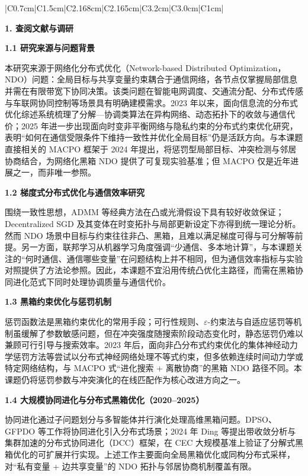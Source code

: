 \begin{center}
\begin{tabular}{|C{0.7cm}|C{1.5cm}|C{2.168cm}|C{2.165cm}|C{3.2cm}|C{3.0cm}|C{1cm}|}
{{    \noindent\textbf{1. 查阅文献与调研}
    
    \indent\textbf{1.1 研究来源与问题背景}
    
    本研究来源于网络化分布式优化（Network-based Distributed Optimization，NDO）问题：全局目标与共享变量约束耦合于通信网络，各节点仅掌握局部信息并需在有限带宽下协同决策\cite{chica2023}。该类问题在智能电网调度、交通流分配、分布式传感与车联网协同控制等场景具有明确建模需求。2023 年以来，面向信息流的分布式优化综述系统梳理了分解—协调类算法在异构网络、动态拓扑下的收敛与通信代价\cite{chica2023}；2025 年进一步出现面向时变非平衡网络与隐私约束的分布式约束优化研究\cite{wei2025privacy}，表明“如何在通信受限条件下维持一致性并优化全局目标”仍是活跃方向。与本课题直接相关的 MACPO 框架\cite{chen2024macpo}于 2024 年提出，将惩罚型局部目标、冲突检测与邻居协商结合，为网络化黑箱 NDO 提供了可复现实验基准；但 MACPO 仅是近年进展之一，而非唯一参照。

    \indent\textbf{1.2 梯度式分布式优化与通信效率研究}
    
    围绕一致性思想，ADMM 等经典方法在凸或光滑假设下具有较好收敛保证\cite{boyd2011}；Decentralized SGD 及其变体在时变拓扑与局部更新设定下亦得到统一理论分析\cite{koloskova2020}。然而 NDO 场景中目标与约束往往非凸、黑箱，且难以满足梯度可得与可分解等前提\cite{ghadimi2013}。另一方面，联邦学习从机器学习角度强调“少通信、多本地计算”\cite{mcmahan2017}，与本课题关注的“何时通信、通信哪些变量”在问题结构上并不相同，但为通信效率指标与实验对照提供了方法论参照。因此，本课题不宜沿用传统凸优化主路径，而需在黑箱协同进化范式下同时处理协调质量与通信代价。

    \indent\textbf{1.3 黑箱约束优化与惩罚机制}
    
    惩罚函数法是黑箱约束优化的常用手段；可行性规则、$\varepsilon$-约束法与自适应惩罚等机制虽缓解了参数敏感问题\cite{mezuramontes2011}，但在冲突强度随搜索阶段动态变化时，静态惩罚仍难以兼顾可行引导与搜索效率。2023 年后，面向非凸分布式约束优化的集体神经动力学惩罚方法\cite{huang2024neuro}等尝试以分布式神经网络处理不等式约束，但多依赖连续时间动力学或特定网络结构，与 MACPO 式“进化搜索 + 离散协商”的黑箱 NDO 路径不同。本课题仍将惩罚参数与冲突演化的在线匹配作为核心改进方向之一。

    \indent\textbf{1.4 大规模协同进化与分布式黑箱优化（2020--2025）}
    
    协同进化通过子问题划分与多智能体并行演化处理高维黑箱问题\cite{li2012survey}。DPSO、GFPDO 等工作将协同进化引入分布式场景\cite{yang2008}；2024 年 Ding 等提出带收敛分析与集群加速的分布式协同进化（DCC）框架\cite{ding2024}，在 CEC 大规模基准上验证了分解式黑箱优化的可扩展并行实现。上述工作主要面向全局黑箱优化或同构分布式采样，对“私有变量 + 边共享变量”的 NDO 拓扑与邻居协商机制覆盖有限。

}}
\end{tabular}
\end{center}

